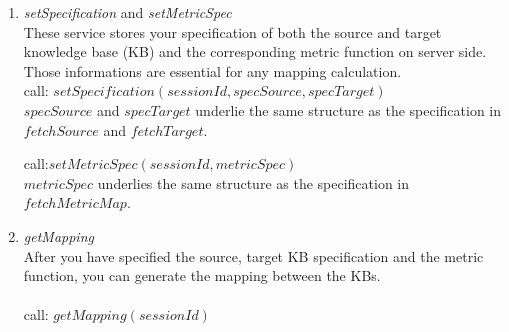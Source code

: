 \documentclass{article}
\begin{document}
\begin{enumerate}
 
\item \textit{setSpecification} and \textit{setMetricSpec}
\\
These service stores your specification of both the source and target knowledge base (KB) and the corresponding metric function on server side. Those informations are essential for any mapping calculation.\\

 call: $setSpecification(sessionId, specSource, specTarget)$\\
 $specSource$ and $specTarget$ underlie the same structure as the specification in $fetchSource$ and $fetchTarget$.
 
 call:$setMetricSpec(sessionId,metricSpec)$\\
 $metricSpec$ underlies the same structure as the specification in 
 $fetchMetricMap$.
 
 \item \textit{getMapping}
 \\
 After you have specified the source, target KB specification and the metric function, you can generate the mapping between the KBs.\\
 \\
 call: $getMapping(sessionId)$
\end{enumerate}

\newpage
\end{document}
